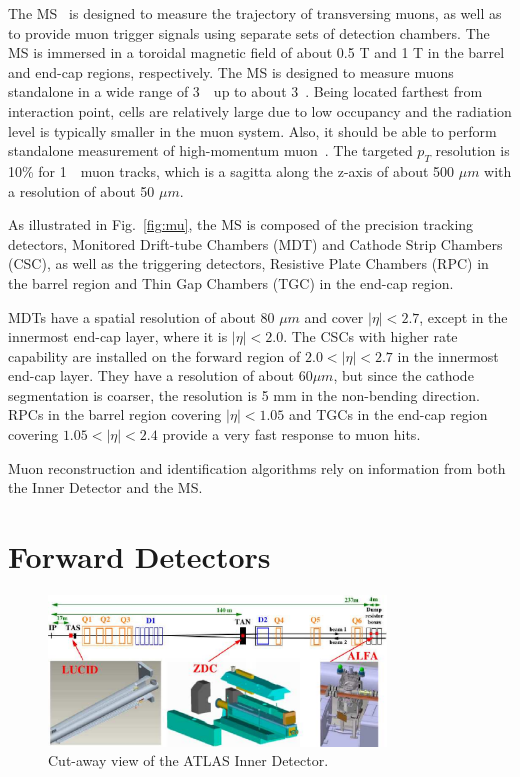 \par The MS~\cite{CERN-LHCC-97-022} is designed to measure the trajectory of transversing muons, as well as to provide muon trigger signals using separate sets of detection chambers. The MS is immersed in a toroidal magnetic field of about 0.5 T and 1 T in the barrel and end-cap regions, respectively. The MS is designed to measure muons standalone in a wide range of 3~\GeV~up to about 3~\TeV. Being located farthest from interaction point, cells are relatively large due to low occupancy and the radiation level is typically smaller in the muon system. Also, it should be able to perform standalone measurement of high-momentum muon~\cite{muon}.
The targeted $p_T$ resolution is 10\% for 1~\TeV~muon tracks, which is a sagitta along the z-axis of about 500 $\mu m$ with a resolution of about 50 $\mu m$.

\par As illustrated in Fig.~\ref{fig:mu}, the MS is composed of the precision tracking detectors, Monitored Drift-tube Chambers (MDT) and Cathode Strip Chambers (CSC), as well as the triggering detectors, Resistive Plate Chambers (RPC) in the barrel region and Thin Gap Chambers (TGC) in the end-cap region.

\par MDTs have a spatial resolution of about 80 $\mu m$ and cover $|\eta| < 2.7$, except in the innermost end-cap layer, where it is $|\eta| < 2.0$. The CSCs with higher rate capability are installed on the forward region of $2.0 < |\eta| < 2.7$ in the innermost end-cap layer. They have a resolution of about 60$\mu m$, but since the cathode segmentation is coarser, the resolution is 5 mm in the non-bending direction. RPCs in the barrel region covering $|\eta| < 1.05$ and TGCs in the end-cap region covering $1.05 < |\eta| < 2.4$ provide a very fast response to muon hits.


\par Muon reconstruction and identification algorithms rely on information from both the Inner Detector and the MS.

\section{Forward Detectors}
\label{sec:for}
\begin{figure}[htbp]
    \centering
    \includegraphics[width=0.8\textwidth]{chapters/c4/figures/forward}
    \caption{Cut-away view of the ATLAS Inner Detector.}
    \label{fig:forward}
\end{figure}

